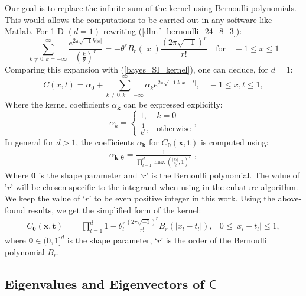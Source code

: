 \documentclass[smallextended]{svjour3}       %
\newcommand{\bm}[1]{\boldsymbol{#1}}
\newcommand{\vtheta}{{\bm{\theta}}}
\newcommand{\vk}{\bm{k}}
\newcommand{\vt}{\bm{t}}
\newcommand{\vx}{\bm{x}}
\newcommand{\mC}{\mathsf{C}}
\begin{document}
Our goal is to replace the infinite sum of the kernel using Bernoulli polynomials. This would allows the computations to be carried out in any software like Matlab.
For 1-D $(d=1)$ rewriting (\ref{dlmf_bernoulli_24_8_3}):
\[
\sum_{k \neq 0, k=-\infty}^\infty \frac{e^{2\pi\sqrt{-1} k |x|}}{ (\frac{k}{\theta})^{r}}
=
-{\theta^r} B_{r}(|x|) \frac{(2 \pi \sqrt{-1})^{r}}{r!}
\quad \text{for} \quad -1 \leq x \leq 1
\]
Comparing this expansion with (\ref{bayes_SI_kernel}), one can deduce, for $d=1$:
\[
C({x}, {t}) = 
\alpha_0 + \sum_{k \neq 0, k=-\infty}^\infty \alpha_k e^{2\pi\sqrt{-1} k |x-t|}   
, \quad -1 \leq x,t \leq 1,
\]
Where the kernel coefficients ${\alpha}_{\vk}$ can be expressed explicitly:
\[
\alpha_k = 
\begin{cases}
1, & k=0 \\
\frac{1}{k^r}, & \text{otherwise}
\end{cases},
\]
In general for $d>1$, the coefficients $\alpha_{\vk}$ for $C_{\vtheta}(\vx,\vt)$ is computed using:
\begin{align*}
\alpha_{\vk, \vtheta} = \frac{1}{\prod_{l=1}^d \max(\frac{|k_l|}{\theta_l}, 1)^r} \; ,
\end{align*}
Where $\vtheta$ is the shape parameter and `$r$' is the Bernoulli polynomial. The value of '$r$' will be chosen specific to the integrand when using in the cubature algorithm. We keep the value of `$r$' to be even positive integer in this work.
Using the above-found results, we get the simplified form of the kernel:
\begin{align}
\label{the_kernel_eqn_bernoulli}
C_\vtheta(\vx, \vt) &=
 \prod_{l=1}^d
1 - \theta_l^r \frac{(2 \pi \sqrt{-1})^{r}}{r!} B_{r}( |{x_l-t_l}| ),
& 0 \leq |x_l - t_l| \leq 1,
\end{align}
where $\vtheta \in (0,1]^d$ is the {shape parameter}, `$r$' is the order of the Bernoulli polynomial $B_{r}$.



















\subsection{Eigenvalues and Eigenvectors of $\mC$}
\end{document}
